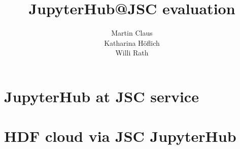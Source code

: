 \documentclass[11pt,a4paper]{article}
\title{\textbf{JupyterHub@JSC evaluation}}
\author{
  Martin Claus \\ %
	Katharina Höflich \\
	Willi Rath}
\begin{document}
\maketitle


\tableofcontents


%





\section{JupyterHub at JSC service}

















\section{HDF cloud via JSC JupyterHub}
\label{s-hdfcloud-jsc-jhub}









\end{document}
